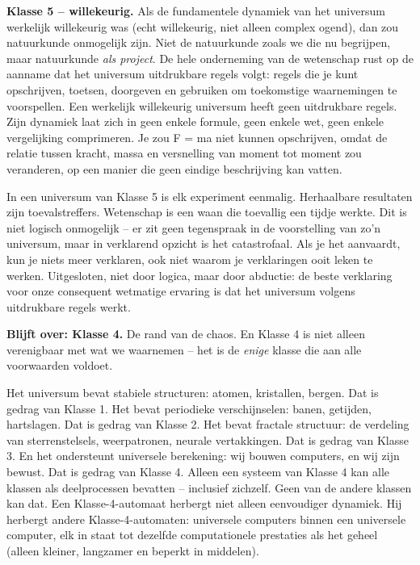 \documentclass[11pt, twoside, openright]{book}
\begin{document}
\textbf{Klasse 5 -- willekeurig.} Als de fundamentele dynamiek van het universum werkelijk willekeurig was (echt willekeurig, niet alleen complex ogend), dan zou natuurkunde onmogelijk zijn. Niet de natuurkunde zoals we die nu begrijpen, maar natuurkunde \textit{als project}. De hele onderneming van de wetenschap rust op de aanname dat het universum uitdrukbare regels volgt: regels die je kunt opschrijven, toetsen, doorgeven en gebruiken om toekomstige waarnemingen te voorspellen. Een werkelijk willekeurig universum heeft geen uitdrukbare regels. Zijn dynamiek laat zich in geen enkele formule, geen enkele wet, geen enkele vergelijking comprimeren. Je zou F = ma niet kunnen opschrijven, omdat de relatie tussen kracht, massa en versnelling van moment tot moment zou veranderen, op een manier die geen eindige beschrijving kan vatten.

In een universum van Klasse 5 is elk experiment eenmalig. Herhaalbare resultaten zijn toevalstreffers. Wetenschap is een waan die toevallig een tijdje werkte. Dit is niet logisch onmogelijk -- er zit geen tegenspraak in de voorstelling van zo'n universum, maar in verklarend opzicht is het catastrofaal. Als je het aanvaardt, kun je niets meer verklaren, ook niet waarom je verklaringen ooit leken te werken. Uitgesloten, niet door logica, maar door abductie: de beste verklaring voor onze consequent wetmatige ervaring is dat het universum volgens uitdrukbare regels werkt.

\textbf{Blijft over: Klasse 4.} De rand van de chaos. En Klasse 4 is niet alleen verenigbaar met wat we waarnemen -- het is de \textit{enige} klasse die aan alle voorwaarden voldoet.

Het universum bevat stabiele structuren: atomen, kristallen, bergen. Dat is gedrag van Klasse 1. Het bevat periodieke verschijnselen: banen, getijden, hartslagen. Dat is gedrag van Klasse 2. Het bevat fractale structuur: de verdeling van sterrenstelsels, weerpatronen, neurale vertakkingen. Dat is gedrag van Klasse 3. En het ondersteunt universele berekening: wij bouwen computers, en wij zijn bewust. Dat is gedrag van Klasse 4. Alleen een systeem van Klasse 4 kan alle klassen als deelprocessen bevatten -- inclusief zichzelf. Geen van de andere klassen kan dat. Een Klasse-4-automaat herbergt niet alleen eenvoudiger dynamiek. Hij herbergt andere Klasse-4-automaten: universele computers binnen een universele computer, elk in staat tot dezelfde computationele prestaties als het geheel (alleen kleiner, langzamer en beperkt in middelen).
\end{document}
